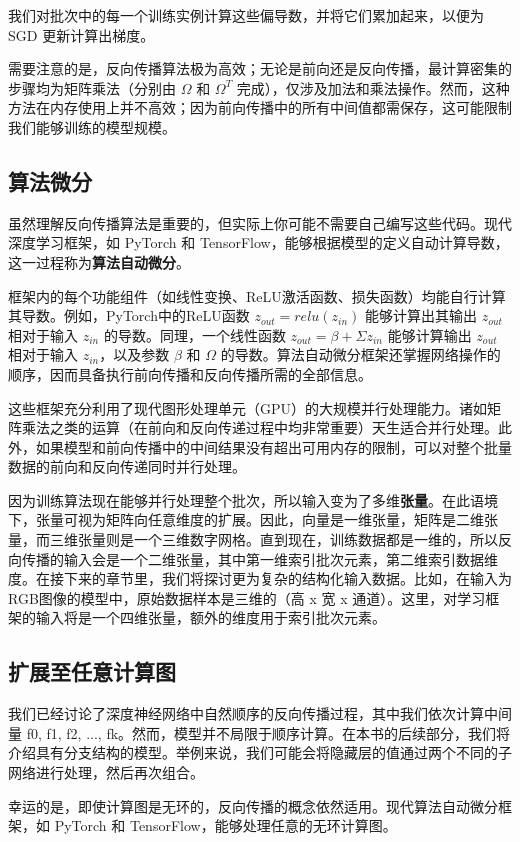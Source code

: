 我们对批次中的每一个训练实例计算这些偏导数，并将它们累加起来，以便为 SGD 更新计算出梯度。

需要注意的是，反向传播算法极为高效；无论是前向还是反向传播，最计算密集的步骤均为矩阵乘法（分别由 \(\Omega\) 和 \(\Omega^T\) 完成），仅涉及加法和乘法操作。然而，这种方法在内存使用上并不高效；因为前向传播中的所有中间值都需保存，这可能限制我们能够训练的模型规模。
\subsection{算法微分}
虽然理解反向传播算法是重要的，但实际上你可能不需要自己编写这些代码。现代深度学习框架，如 PyTorch 和 TensorFlow，能够根据模型的定义自动计算导数，这一过程称为\textbf{算法自动微分}。

框架内的每个功能组件（如线性变换、ReLU激活函数、损失函数）均能自行计算其导数。例如，PyTorch中的ReLU函数 \(z_{out} = relu(z_{in})\) 能够计算出其输出 \(z_{out}\) 相对于输入 \(z_{in}\) 的导数。同理，一个线性函数 \(z_{out} = \beta + \Sigma z_{in}\) 能够计算输出 \(z_{out}\) 相对于输入 \(z_{in}\)，以及参数 \(\beta\) 和 \(\Omega\) 的导数。算法自动微分框架还掌握网络操作的顺序，因而具备执行前向传播和反向传播所需的全部信息。

这些框架充分利用了现代图形处理单元（GPU）的大规模并行处理能力。诸如矩阵乘法之类的运算（在前向和反向传递过程中均非常重要）天生适合并行处理。此外，如果模型和前向传播中的中间结果没有超出可用内存的限制，可以对整个批量数据的前向和反向传递同时并行处理。

因为训练算法现在能够并行处理整个批次，所以输入变为了多维\textbf{张量}。在此语境下，张量可视为矩阵向任意维度的扩展。因此，向量是一维张量，矩阵是二维张量，而三维张量则是一个三维数字网格。直到现在，训练数据都是一维的，所以反向传播的输入会是一个二维张量，其中第一维索引批次元素，第二维索引数据维度。在接下来的章节里，我们将探讨更为复杂的结构化输入数据。比如，在输入为RGB图像的模型中，原始数据样本是三维的（高 x 宽 x 通道）。这里，对学习框架的输入将是一个四维张量，额外的维度用于索引批次元素。
\subsection{扩展至任意计算图}
我们已经讨论了深度神经网络中自然顺序的反向传播过程，其中我们依次计算中间量 f0, f1, f2, ..., fk。然而，模型并不局限于顺序计算。在本书的后续部分，我们将介绍具有分支结构的模型。举例来说，我们可能会将隐藏层的值通过两个不同的子网络进行处理，然后再次组合。

幸运的是，即使计算图是无环的，反向传播的概念依然适用。现代算法自动微分框架，如 PyTorch 和 TensorFlow，能够处理任意的无环计算图。
